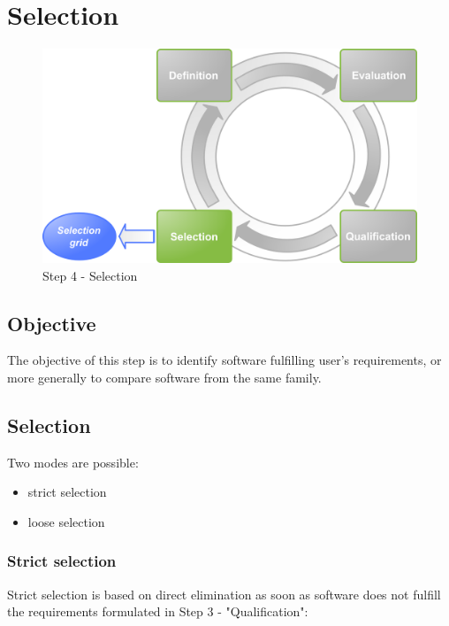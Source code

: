 %
\section{Selection}
\begin{figure}[h]
\includegraphics[width=13cm]{images/selectionner}
\caption{Step 4 - Selection}
\end{figure}

\subsection{Objective}
The objective of this step is to identify software fulfilling user's requirements, 
or more generally to compare software from the same family.

\subsection{Selection}
Two modes are possible:
\begin{itemize}
\item strict selection
\item loose selection
\end{itemize}


\subsubsection{Strict selection}
Strict selection is based on direct elimination as soon as software
does not fulfill the requirements formulated in Step 3 - "Qualification":

